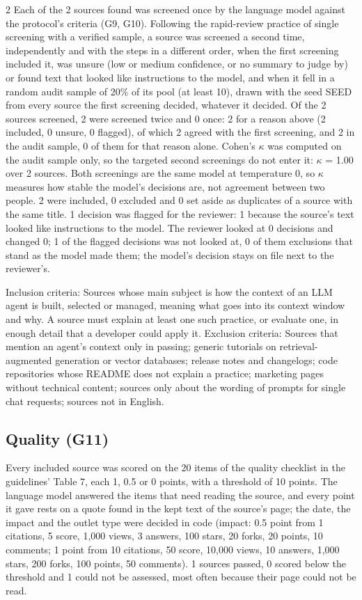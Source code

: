 \documentclass[10pt,a4paper]{article}
\begin{document}
\begin{multicols}{2}
Each of the 2 sources found was screened once by the language model against the protocol's criteria (G9, G10).
Following the rapid-review practice of single screening with a verified sample, a source was screened a second time, independently and with the steps in a different order, when the first screening included it, was unsure (low or medium confidence, or no summary to judge by) or found text that looked like instructions to the model, and when it fell in a random audit sample of 20\% of its pool (at least 10), drawn with the seed SEED from every source the first screening decided, whatever it decided.
Of the 2 sources screened, 2 were screened twice and 0 once: 2 for a reason above (2 included, 0 unsure, 0 flagged), of which 2 agreed with the first screening, and 2 in the audit sample, 0 of them for that reason alone.
Cohen's $\kappa$ was computed on the audit sample only, so the targeted second screenings do not enter it: $\kappa$ = 1.00 over 2 sources.
Both screenings are the same model at temperature 0, so $\kappa$ measures how stable the model's decisions are, not agreement between two people. 2 were included, 0 excluded and 0 set aside as duplicates of a source with the same title. 1 decision was flagged for the reviewer: 1 because the source's text looked like instructions to the model.
The reviewer looked at 0 decisions and changed 0; 1 of the flagged decisions was not looked at, 0 of them exclusions that stand as the model made them; the model's decision stays on file next to the reviewer's.

Inclusion criteria: Sources whose main subject is how the context of an LLM agent is built, selected or managed, meaning what goes into its context window and why.
A source must explain at least one such practice, or evaluate one, in enough detail that a developer could apply it.
Exclusion criteria: Sources that mention an agent's context only in passing; generic tutorials on retrieval-augmented generation or vector databases; release notes and changelogs; code repositories whose README does not explain a practice; marketing pages without technical content; sources only about the wording of prompts for single chat requests; sources not in English.

\subsection{Quality (G11)}\label{sec:quality-g11}

Every included source was scored on the 20 items of the quality checklist in the guidelines' Table 7, each 1, 0.5 or 0 points, with a threshold of 10 points.
The language model answered the items that need reading the source, and every point it gave rests on a quote found in the kept text of the source's page; the date, the impact and the outlet type were decided in code (impact: 0.5 point from 1 citations, 5 score, 1,000 views, 3 answers, 100 stars, 20 forks, 20 points, 10 comments; 1 point from 10 citations, 50 score, 10,000 views, 10 answers, 1,000 stars, 200 forks, 100 points, 50 comments). 1 sources passed, 0 scored below the threshold and 1 could not be assessed, most often because their page could not be read.


\end{multicols}
\end{document}

